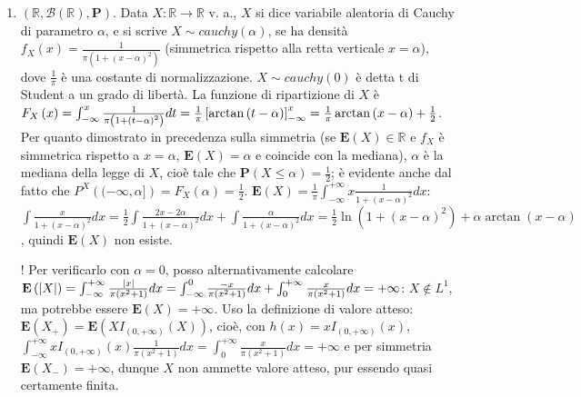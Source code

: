 \documentclass{article}
\begin{document}
\begin{enumerate}
\item $\left( 
\mathbb{R}
,\mathcal{B}\left( 
\mathbb{R}
\right) ,\mathbf{P}\right) $. Data $X:%
\mathbb{R}
\rightarrow 
\mathbb{R}
$ v. a., $X$ si dice variabile aleatoria di Cauchy di parametro $\alpha $, e
si scrive $X\sim cauchy\left( \alpha \right) $, se ha densit\`{a} $%
f_{X}\left( x\right) =\frac{1}{\pi \left( 1+\left( x-\alpha \right)
^{2}\right) }$ (simmetrica rispetto alla retta verticale $x=\alpha $), dove $%
\frac{1}{\pi }$ \`{e} una costante di normalizzazione. $X\sim cauchy\left(
0\right) $ \`{e} detta t di Student a un grado di libert\`{a}. La funzione
di ripartizione di $X$ \`{e} $F_{X}\left( x\right) =\int_{-\infty }^{x}\frac{%
1}{\pi \left( 1+\left( t-\alpha \right) ^{2}\right) }dt=\frac{1}{\pi }\left[
\arctan \left( t-\alpha \right) \right] _{-\infty }^{x}=\frac{1}{\pi }%
\arctan \left( x-\alpha \right) +\frac{1}{2}$. Per quanto dimostrato in
precedenza sulla simmetria (se $\mathbf{E}\left( X\right) \in 
\mathbb{R}
$ e $f_{X}$ \`{e} simmetrica rispetto a $x=\alpha $, $\mathbf{E}\left(
X\right) =\alpha $ e coincide con la mediana), $\alpha $ \`{e} la mediana
della legge di $X$, cio\`{e} tale che $\mathbf{P}\left( X\leq \alpha \right)
=\frac{1}{2}$; \`{e} evidente anche dal fatto che $P^{X}\left( (-\infty
,\alpha ]\right) =F_{X}\left( \alpha \right) =\frac{1}{2}$. $\mathbf{E}%
\left( X\right) =\frac{1}{\pi }\int_{-\infty }^{+\infty }x\frac{1}{1+\left(
x-\alpha \right) ^{2}}dx$: $\int \frac{x}{1+\left( x-\alpha \right) ^{2}}dx=%
\frac{1}{2}\int \frac{2x-2\alpha }{1+\left( x-\alpha \right) ^{2}}dx+\int 
\frac{\alpha }{1+\left( x-\alpha \right) ^{2}}dx=\frac{1}{2}\ln \left(
1+\left( x-\alpha \right) ^{2}\right) +\alpha \arctan \left( x-\alpha
\right) $, quindi $\mathbf{E}\left( X\right) $ non esiste.

! Per verificarlo con $\alpha =0$, posso alternativamente calcolare $\mathbf{%
E}\left( \left\vert X\right\vert \right) =\int_{-\infty }^{+\infty }\frac{%
\left\vert x\right\vert }{\pi \left( x^{2}+1\right) }dx=\int_{-\infty }^{0}%
\frac{-x}{\pi \left( x^{2}+1\right) }dx+\int_{0}^{+\infty }\frac{x}{\pi
\left( x^{2}+1\right) }dx=+\infty $: $X\not\in L^{1}$, ma potrebbe essere $%
\mathbf{E}\left( X\right) =+\infty $. Uso la definizione di valore atteso: $%
\mathbf{E}\left( X_{+}\right) =\mathbf{E}\left( XI_{\left( 0,+\infty \right)
}\left( X\right) \right) $, cio\`{e}, con $h\left( x\right) =xI_{\left(
0,+\infty \right) }\left( x\right) $, $\int_{-\infty }^{+\infty }xI_{\left(
0,+\infty \right) }\left( x\right) \frac{1}{\pi \left( x^{2}+1\right) }%
dx=\int_{0}^{+\infty }\frac{x}{\pi \left( x^{2}+1\right) }dx=+\infty $ e per
simmetria $\mathbf{E}\left( X_{-}\right) =+\infty $, dunque $X$ non ammette
valore atteso, pur essendo quasi certamente finita.


\end{enumerate}
\end{document}
